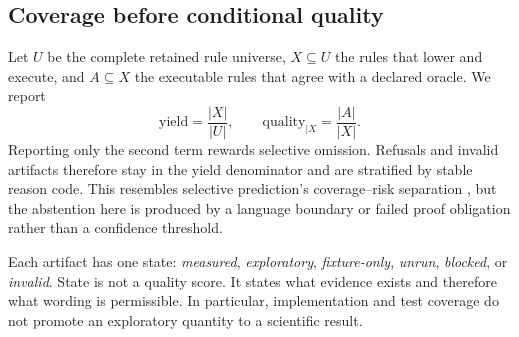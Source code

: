 \subsection{Coverage before conditional quality}

Let $U$ be the complete retained rule universe, $X\subseteq U$ the rules that
lower and execute, and $A\subseteq X$ the executable rules that agree with a
declared oracle. We report
\begin{equation}
  \mathrm{yield}=\frac{|X|}{|U|}, \qquad
  \mathrm{quality}_{\mid X}=\frac{|A|}{|X|}.
  \label{eq:yield-quality}
\end{equation}
Reporting only the second term rewards selective omission. Refusals and invalid
artifacts therefore stay in the yield denominator and are stratified by stable
reason code. This resembles selective prediction's coverage--risk separation
\citep{geifman2017selective}, but the abstention here is produced by a language
boundary or failed proof obligation rather than a confidence threshold.

Each artifact has one state: \emph{measured}, \emph{exploratory},
\emph{fixture-only}, \emph{unrun}, \emph{blocked}, or \emph{invalid}. State is
not a quality score. It states what evidence exists and therefore what wording
is permissible. In particular, implementation and test coverage do not promote
an exploratory quantity to a scientific result.
